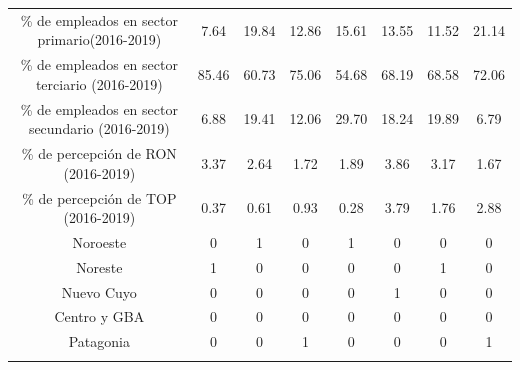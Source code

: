 \documentclass[12pt,a4paper]{article}
\begin{document}
\begin{table}
\begin{tabular}{@{\extracolsep{5pt}} cccccccc}
\% de empleados en sector primario(2016-2019) & 7.64 & 19.84 & 12.86 & 15.61 & 13.55 & 11.52 & 21.14 \\ 
\% de empleados en sector terciario (2016-2019) & 85.46 &  60.73 & 75.06 & 54.68 & 68.19 & 68.58 & 72.06 \\ 
\% de empleados en sector secundario (2016-2019) & 6.88 & 19.41 & 12.06 & 29.70 & 18.24 & 19.89 & 6.79 \\ 
\% de percepción de RON (2016-2019) & 3.37 & 2.64 & 1.72 & 1.89 & 3.86 & 3.17 & 1.67 \\ 
\% de percepción de TOP (2016-2019) & 0.37 & 0.61 & 0.93 & 0.28 & 3.79 & 1.76 & 2.88 \\ 
Noroeste & 0 & 1 & 0 & 1 & 0 & 0 & 0 \\ 
Noreste & 1 & 0 & 0 & 0 & 0 & 1 & 0 \\ 
Nuevo Cuyo & 0 & 0 & 0 & 0 & 1 & 0 & 0 \\ 
Centro y GBA & 0 & 0 & 0 & 0 & 0 & 0 & 0 \\ 
Patagonia & 0 & 0 & 1 & 0 & 0 & 0 & 1 \\ 
\hline \\[-1.8ex] 
\end{tabular} 


\end{table} 
\end{document}
